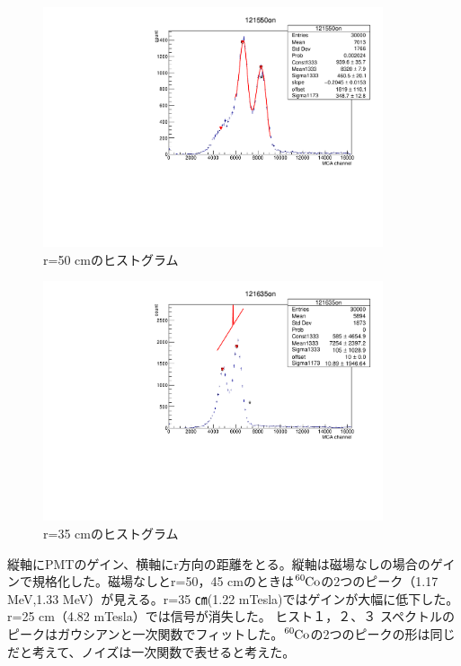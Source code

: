 \begin{figure}[H]
	\centering
		\includegraphics[angle=-90,width=10cm]{fig/iguchi/121550on.pdf}
	\caption{r=50 cmのヒストグラム}
	\label{hist50}
\end{figure}
\begin{figure}[H]
	\centering
		\includegraphics[angle=-90,width=10cm]{fig/iguchi/121635on.pdf}
	\caption{r=35 cmのヒストグラム}
	\label{hist35}
\end{figure}
縦軸にPMTのゲイン、横軸にr方向の距離をとる。縦軸は磁場なしの場合のゲインで規格化した。磁場なしとr=50，45 cmのときは$\ce{^{60}Co}$の2つのピーク（1.17 MeV,1.33 MeV）が見える。r=35 ㎝(1.22 mTesla)ではゲインが大幅に低下した。r=25 cm（4.82 mTesla）では信号が消失した。
ヒスト１，２、３
スペクトルのピークはガウシアンと一次関数でフィットした。$\ce{^{60}Co}$の2つのピークの形は同じだと考えて、ノイズは一次関数で表せると考えた。
